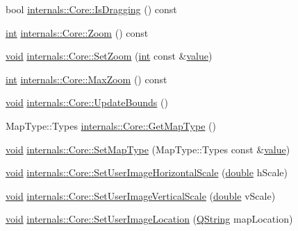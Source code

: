 \begin{DoxyCompactItemize}
bool \hyperlink{group___o_p_map_widget_gad8a3ada83240ab83169d589af8486058}{internals\-::\-Core\-::\-Is\-Dragging} () const 
\item 
\hyperlink{ioapi_8h_a787fa3cf048117ba7123753c1e74fcd6}{int} \hyperlink{group___o_p_map_widget_ga5cf2de6f702a137c1c43767aad11b160}{internals\-::\-Core\-::\-Zoom} () const 
\item 
\hyperlink{group___u_a_v_objects_plugin_ga444cf2ff3f0ecbe028adce838d373f5c}{void} \hyperlink{group___o_p_map_widget_ga5cdc1bd7abb72b74bb3cf85d3aec9e3d}{internals\-::\-Core\-::\-Set\-Zoom} (\hyperlink{ioapi_8h_a787fa3cf048117ba7123753c1e74fcd6}{int} const \&\hyperlink{glext_8h_aa0e2e9cea7f208d28acda0480144beb0}{value})
\item 
\hyperlink{ioapi_8h_a787fa3cf048117ba7123753c1e74fcd6}{int} \hyperlink{group___o_p_map_widget_ga50e3825136212baafad997c35bf606ef}{internals\-::\-Core\-::\-Max\-Zoom} () const 
\item 
\hyperlink{group___u_a_v_objects_plugin_ga444cf2ff3f0ecbe028adce838d373f5c}{void} \hyperlink{group___o_p_map_widget_gacbeb6f00e71443854ec421841d9bc431}{internals\-::\-Core\-::\-Update\-Bounds} ()
\item 
Map\-Type\-::\-Types \hyperlink{group___o_p_map_widget_gad38d6a52a014cb9b52c6df7d47f3e3fe}{internals\-::\-Core\-::\-Get\-Map\-Type} ()
\item 
\hyperlink{group___u_a_v_objects_plugin_ga444cf2ff3f0ecbe028adce838d373f5c}{void} \hyperlink{group___o_p_map_widget_ga5d71e20762c9714191db9f74f3dd3b6a}{internals\-::\-Core\-::\-Set\-Map\-Type} (Map\-Type\-::\-Types const \&\hyperlink{glext_8h_aa0e2e9cea7f208d28acda0480144beb0}{value})
\item 
\hyperlink{group___u_a_v_objects_plugin_ga444cf2ff3f0ecbe028adce838d373f5c}{void} \hyperlink{group___o_p_map_widget_ga597dd716558e9c45baa91de591f4ce07}{internals\-::\-Core\-::\-Set\-User\-Image\-Horizontal\-Scale} (\hyperlink{_super_l_u_support_8h_a8956b2b9f49bf918deed98379d159ca7}{double} h\-Scale)
\item 
\hyperlink{group___u_a_v_objects_plugin_ga444cf2ff3f0ecbe028adce838d373f5c}{void} \hyperlink{group___o_p_map_widget_gae296cd09fb96cfeadbe202f9cba7e1fd}{internals\-::\-Core\-::\-Set\-User\-Image\-Vertical\-Scale} (\hyperlink{_super_l_u_support_8h_a8956b2b9f49bf918deed98379d159ca7}{double} v\-Scale)
\item 
\hyperlink{group___u_a_v_objects_plugin_ga444cf2ff3f0ecbe028adce838d373f5c}{void} \hyperlink{group___o_p_map_widget_gafe136669e790fac1607a72f7bfca9510}{internals\-::\-Core\-::\-Set\-User\-Image\-Location} (\hyperlink{group___u_a_v_objects_plugin_gab9d252f49c333c94a72f97ce3105a32d}{Q\-String} map\-Location)

\end{DoxyCompactItemize}
